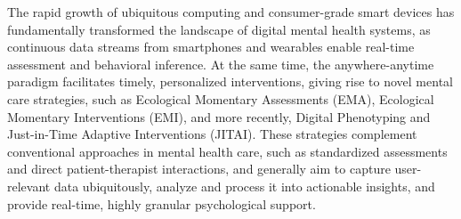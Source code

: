 

The rapid growth of ubiquitous computing and consumer-grade smart devices has fundamentally transformed the landscape of digital mental health systems, as continuous data streams from smartphones and wearables enable real-time assessment and behavioral inference. At the same time, the anywhere-anytime paradigm facilitates timely, personalized interventions, giving rise to novel mental care strategies, such as Ecological Momentary Assessments (EMA)\cite{stone1994ecological}, Ecological Momentary Interventions (EMI)\cite{balaskas2021ecological}, and more recently, Digital Phenotyping \cite{bufano2023digital} and Just-in-Time Adaptive Interventions (JITAI)\cite{nahumshani2018jitai}. These strategies complement conventional approaches in mental health care, such as standardized assessments and direct patient-therapist interactions, and generally aim to capture user-relevant data ubiquitously, analyze and process it into actionable insights, and provide real-time, highly granular psychological support. 

